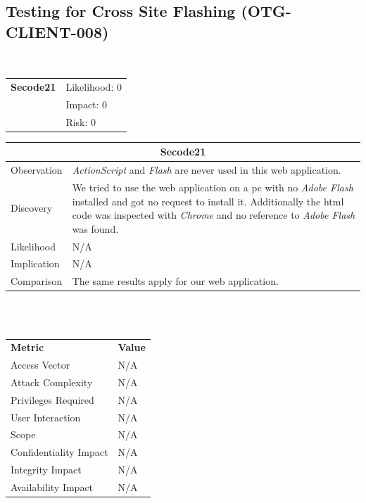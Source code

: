 \documentclass[headsepline,footsepline,footinclude=false,oneside,fontsize=11pt,paper=a4,listof=totoc,bibliography=totoc]{scrbook} %
\begin{document}
\subsection{Testing for Cross Site Flashing (OTG-CLIENT-008)}\
\begin{tabular}{cR{12cm}}
	\textbf{Secode21} & Likelihood: 0\\& Impact: 0\\& Risk: 0
\end{tabular}

\begin{tabular}{ l|p{11cm}  }
	\hline
	\multicolumn{2}{c}{\textbf{Secode21}} \\
	\hline
	Observation   & \textit{ActionScript} and \textit{Flash} are never used in this web application. \\
	Discovery  & We tried to use the web application on a pc with no \textit{Adobe Flash} installed and got no request to install it. Additionally the html code was inspected with \textit{Chrome} and no reference to \textit{Adobe Flash} was found. \\
	Likelihood & N/A \\
	Implication    & N/A \\
	Comparison & The same results apply for our web application.  \\
	\hline
\end{tabular}
\\
\vspace{0.5cm}
\\
\begin{center}
	\begin{tabular}{ll}
		\rowcolor[HTML]{34CDF9}
		{\color[HTML]{ECF4FF} \textbf{Metric}}        & {\color[HTML]{ECF4FF} \textbf{Value}} \\
		\rowcolor[HTML]{BBDAFF}
		{\color[HTML]{333333} Access Vector}          & {\color[HTML]{333333} } N/A              \\
		\rowcolor[HTML]{ECF4FF}
		{\color[HTML]{333333} Attack Complexity}      & {\color[HTML]{333333} } N/A              \\
		\rowcolor[HTML]{BBDAFF}
		{\color[HTML]{333333} Privileges Required}    & {\color[HTML]{333333} } N/A              \\
		\rowcolor[HTML]{ECF4FF}
		{\color[HTML]{333333} User Interaction}       & {\color[HTML]{333333} } N/A              \\
		\rowcolor[HTML]{BBDAFF}
		{\color[HTML]{333333} Scope}                  & {\color[HTML]{333333} } N/A              \\
		\rowcolor[HTML]{ECF4FF}
		{\color[HTML]{333333} Confidentiality Impact} & {\color[HTML]{333333} } N/A              \\
		\rowcolor[HTML]{BBDAFF}
		{\color[HTML]{333333} Integrity Impact}       & {\color[HTML]{333333} } N/A              \\
		\rowcolor[HTML]{ECF4FF}
		{\color[HTML]{333333} Availability Impact}    & {\color[HTML]{333333} } N/A
	\end{tabular}
\end{center}
\pagebreak
\end{document}
